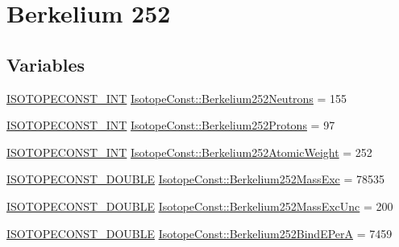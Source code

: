 \hypertarget{group___isotope_const-_berkelium-_bk252}{}\section{Berkelium 252}
\label{group___isotope_const-_berkelium-_bk252}
\subsection*{Variables}
\begin{DoxyCompactItemize}
\item 
\mbox{\hyperlink{group___isotope_const-_macros_ga5f18360b3e99483a35c32d789e62621c}{I\+S\+O\+T\+O\+P\+E\+C\+O\+N\+S\+T\+\_\+\+I\+NT}} \mbox{\hyperlink{group___isotope_const-_berkelium-_bk252_ga30025d35f83f5d60290fec9f978f945a}{Isotope\+Const\+::\+Berkelium252\+Neutrons}} = 155
\item 
\mbox{\hyperlink{group___isotope_const-_macros_ga5f18360b3e99483a35c32d789e62621c}{I\+S\+O\+T\+O\+P\+E\+C\+O\+N\+S\+T\+\_\+\+I\+NT}} \mbox{\hyperlink{group___isotope_const-_berkelium-_bk252_gaaf2cb323da3a92631e3d10c828d0e1d6}{Isotope\+Const\+::\+Berkelium252\+Protons}} = 97
\item 
\mbox{\hyperlink{group___isotope_const-_macros_ga5f18360b3e99483a35c32d789e62621c}{I\+S\+O\+T\+O\+P\+E\+C\+O\+N\+S\+T\+\_\+\+I\+NT}} \mbox{\hyperlink{group___isotope_const-_berkelium-_bk252_gaae861633389c010905a5c511d33f1108}{Isotope\+Const\+::\+Berkelium252\+Atomic\+Weight}} = 252
\item 
\mbox{\hyperlink{group___isotope_const-_macros_ga8f45a7272ce02c0b4c65c44636ed719a}{I\+S\+O\+T\+O\+P\+E\+C\+O\+N\+S\+T\+\_\+\+D\+O\+U\+B\+LE}} \mbox{\hyperlink{group___isotope_const-_berkelium-_bk252_gac966a9a025c016c9f0ecfa1f81afb937}{Isotope\+Const\+::\+Berkelium252\+Mass\+Exc}} = 78535
\item 
\mbox{\hyperlink{group___isotope_const-_macros_ga8f45a7272ce02c0b4c65c44636ed719a}{I\+S\+O\+T\+O\+P\+E\+C\+O\+N\+S\+T\+\_\+\+D\+O\+U\+B\+LE}} \mbox{\hyperlink{group___isotope_const-_berkelium-_bk252_gaa3ada92f220420184f042019f76c5bdf}{Isotope\+Const\+::\+Berkelium252\+Mass\+Exc\+Unc}} = 200
\item 
\mbox{\hyperlink{group___isotope_const-_macros_ga8f45a7272ce02c0b4c65c44636ed719a}{I\+S\+O\+T\+O\+P\+E\+C\+O\+N\+S\+T\+\_\+\+D\+O\+U\+B\+LE}} \mbox{\hyperlink{group___isotope_const-_berkelium-_bk252_gaf18742e01f7175350145c3cfe7f318cb}{Isotope\+Const\+::\+Berkelium252\+Bind\+E\+PerA}} = 7459
\item 

\end{DoxyCompactItemize}
